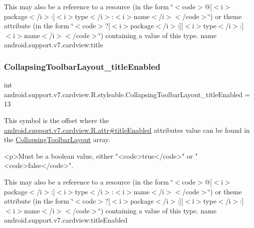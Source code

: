This may also be a reference to a resource (in the form \char`\"{}$<$code$>$@\mbox{[}$<$i$>$package$<$/i$>$\+:\mbox{]}$<$i$>$type$<$/i$>$\+:$<$i$>$name$<$/i$>$$<$/code$>$\char`\"{}) or theme attribute (in the form \char`\"{}$<$code$>$?\mbox{[}$<$i$>$package$<$/i$>$\+:\mbox{]}\mbox{[}$<$i$>$type$<$/i$>$\+:\mbox{]}$<$i$>$name$<$/i$>$$<$/code$>$\char`\"{}) containing a value of this type.  name android.\+support.\+v7.\+cardview\+:title \mbox{\label{classandroid_1_1support_1_1v7_1_1cardview_1_1R_1_1styleable_ac3162e6203b6488dcc98da969976ddda}} 
\subsubsection{\texorpdfstring{Collapsing\+Toolbar\+Layout\+\_\+title\+Enabled}{CollapsingToolbarLayout\_titleEnabled}}
{\footnotesize\ttfamily int android.\+support.\+v7.\+cardview.\+R.\+styleable.\+Collapsing\+Toolbar\+Layout\+\_\+title\+Enabled = 13\hspace{0.3cm}{\ttfamily [static]}}

This symbol is the offset where the \hyperlink{classandroid_1_1support_1_1v7_1_1cardview_1_1R_1_1attr_a2d1b48caa3eb8f5dc01cf4ef925c372d}{android.\+support.\+v7.\+cardview.\+R.\+attr\#title\+Enabled} attribute\textquotesingle{}s value can be found in the \hyperlink{classandroid_1_1support_1_1v7_1_1cardview_1_1R_1_1styleable_a3b4c5393d0c99cb4e5a7a3911fc606b4}{Collapsing\+Toolbar\+Layout} array.

\begin{DoxyVerb}      <p>Must be a boolean value, either "<code>true</code>" or "<code>false</code>".
\end{DoxyVerb}
 

This may also be a reference to a resource (in the form \char`\"{}$<$code$>$@\mbox{[}$<$i$>$package$<$/i$>$\+:\mbox{]}$<$i$>$type$<$/i$>$\+:$<$i$>$name$<$/i$>$$<$/code$>$\char`\"{}) or theme attribute (in the form \char`\"{}$<$code$>$?\mbox{[}$<$i$>$package$<$/i$>$\+:\mbox{]}\mbox{[}$<$i$>$type$<$/i$>$\+:\mbox{]}$<$i$>$name$<$/i$>$$<$/code$>$\char`\"{}) containing a value of this type.  name android.\+support.\+v7.\+cardview\+:title\+Enabled \mbox{\label{classandroid_1_1support_1_1v7_1_1cardview_1_1R_1_1styleable_aa0ae88a0aabadbd92010e714caca1dd0}} 
